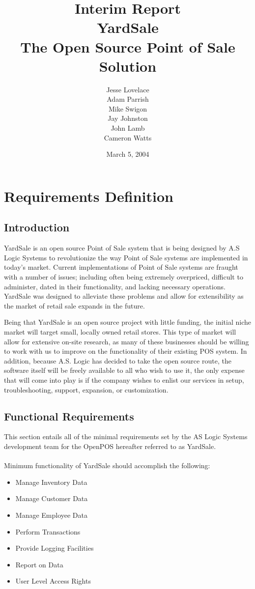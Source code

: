 \documentclass{report}
\title{{\LARGE {\bf Interim Report\\}}YardSale\\The Open Source Point of Sale Solution}
\author{Jesse Lovelace\\Adam Parrish\\Mike Swigon\\Jay Johnston\\John Lamb\\Cameron Watts}
\date{March 5, 2004}
\begin{document}
\maketitle

\tableofcontents

\chapter{Requirements Definition}

\section{Introduction}

YardSale is an open source Point of Sale system that is being
designed by A.S Logic Systems to revolutionize the way Point of
Sale systems are implemented in today's market.  Current
implementations of Point of Sale systems are fraught with a number
of issues; including often being extremely overpriced, difficult
to administer, dated in their functionality, and lacking necessary
operations.  YardSale was designed to alleviate these problems and
allow for extensibility as the market of retail sale expands in
the future.

Being that YardSale is an open source project with little funding,
the initial niche market will target small, locally owned retail
stores.  This type of market will allow for extensive on-site
research, as many of these businesses should be willing to work
with us to improve on the functionality of their existing POS
system.  In addition, because A.S. Logic has decided to take the
open source route, the software itself will be freely available to
all who wish to use it, the only expense that will come into play
is if the company wishes to enlist our services in setup,
troubleshooting, support, expansion, or customization.

\section{Functional Requirements}

This section entails all of the minimal requirements set by the AS
Logic Systems development team for the OpenPOS hereafter referred
to as YardSale.\\
\\Minimum functionality of YardSale should accomplish the
following:

\begin{itemize}
    \item {Manage Inventory Data}
    \item {Manage Customer Data}
    \item {Manage Employee Data}
    \item {Perform Transactions}
    \item {Provide Logging Facilities}
    \item {Report on Data}
    \item {User Level Access Rights}
\end{itemize}
\end{document}
